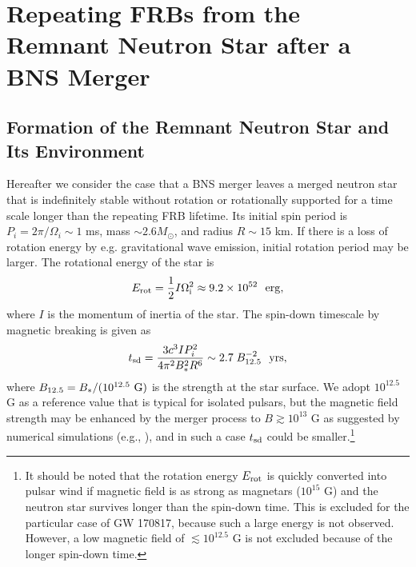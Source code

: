 \documentclass[]{pasj01}
\begin{document}
\section{Repeating FRBs from the
Remnant Neutron Star after a BNS Merger}
\label{sec:repeating-FRBs}

\subsection{Formation of the Remnant Neutron Star and Its Environment}
\label{subsec:PWN}

Hereafter we consider the case that a BNS merger leaves a merged
neutron star that is indefinitely stable without rotation or
rotationally supported for a time scale longer than the repeating FRB
lifetime.  Its initial spin period is $P_i = 2\pi/\Omega_i \sim
1$ ms, mass $\sim 2.6 M_{\odot}$, and radius $R \sim 15$ km.
If there is a loss of rotation energy by
  e.g. gravitational wave emission, initial rotation period may be
  larger. The rotational energy of the star is
\begin{eqnarray}
E_{\rm rot} =\frac{1}{2}I\Omega_{\rm i}^2\approx 9.2 \times10^{52}
\ \ {\rm erg},
\end{eqnarray}
where $I$ is the momentum of inertia of the star.  The spin-down
timescale by magnetic breaking is given as
\begin{eqnarray}
\label{eq: spin-down timescale}
 t_{\rm sd} = \frac{3c^3 I P_i^2}{4\pi^2B_*^2R^6}
\sim 2.7 \; B_{12.5}^{-2} \ \ {\rm yrs}, 
\end{eqnarray}
where $B_{12.5} = B_*/(10^{12.5} \ \rm G)$ is the strength at the star
surface. We adopt $10^{12.5}$ G as a reference value that is typical
for isolated pulsars, but the magnetic field strength may be enhanced
by the merger process to $B\gtrsim10^{13}$ G as suggested by numerical
simulations (e.g., \cite{Kiuchi2014}), and in such a case $t_{\rm sd}$
could be smaller.\footnote{  
 It should be noted that the
  rotation energy $E_{\rm rot}$ is quickly converted into pulsar wind
  if magnetic field is as strong as magnetars ($10^{15}$ G) and the
  neutron star survives longer than the spin-down time.  This is
  excluded for the particular case of GW 170817, because such a large
  energy is not observed. However, a low magnetic field of $\lesssim
  10^{12.5}$ G is not excluded because of the longer spin-down time. }
\end{document}
